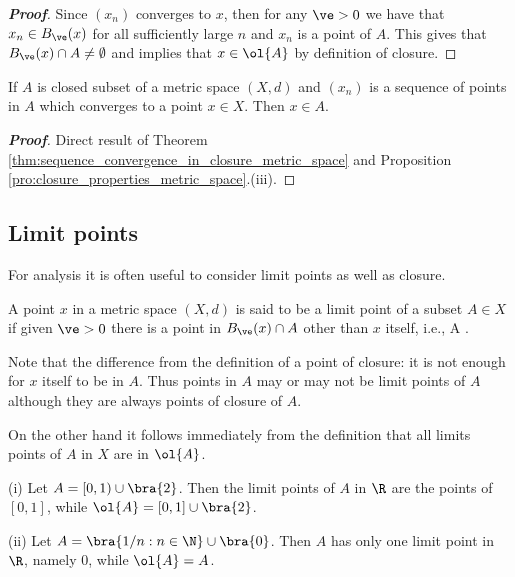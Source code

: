 \begin{proof}[\bf Proof]
Since $(x_n)$ converges to $x$, then for any $\ve>0$ we have that $x_n \in B_\ve(x)$ for all sufficiently large $n$ and $x_n$ is a point of $A$. This gives that $B_\ve(x)\cap A \neq \emptyset$ and implies that $x\in \ol{A}$ by definition of closure.
\end{proof}


\begin{corollary}
If $A$ is closed subset of a metric space $(X,d)$ and $(x_n)$ is a sequence of points in $A$ which converges to a point $x\in X$. Then $x\in A$. 
\end{corollary}

\begin{proof}[\bf Proof]
Direct result of Theorem \ref{thm:sequence_convergence_in_closure_metric_space} and Proposition \ref{pro:closure_properties_metric_space}.(iii).
\end{proof}



\subsection{Limit points}

For analysis it is often useful to consider limit points as well as closure.

\begin{definition}\label{def:limit_point_metric_space}%
A point $x$ in a metric space $(X,d)$ is said to be a limit point of a subset $A\in X$ if given $\ve>0$ there is a point in $B_\ve(x)\cap A$ other than $x$ itself, i.e.,
\be
{}\cap A \neq \emptyset.
\ee
\end{definition}

\begin{remark}
Note that the difference from the definition of a point of closure: it is not enough for $x$ itself to be in $A$. Thus points in $A$ may or may not be limit points of $A$ although they are always points of closure of $A$.

On the other hand it follows immediately from the definition that all limits points of $A$ in $X$ are in $\ol{A}$.
\end{remark}

\begin{example}
\ben
\item [(i)] Let $A=[0,1)\cup \bra{2}$. Then the limit points of $A$ in $\R$ are the points of $[0,1]$, while $\ol{A} = [0,1]\cup\bra{2}$.

\item [(ii)] Let $A = \bra{1/n:n\in \N}\cup \bra{0}$. Then $A$ has only one limit point in $\R$, namely 0, while $\ol{A} = A$.
\een
\end{example}

